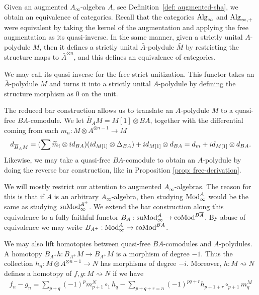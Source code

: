 \documentclass[../thesis.tex]{subfiles}
\begin{document}
            Given an augmented $A_\infty$-algebra $A$, see Definition~\ref{def: augmented-sha}, we obtain an equivalence of categories. Recall that the categories $\tt{Alg}_\infty$ and $\tt{Alg}_{\infty,+}$ were equivalent by taking the kernel of the augmentation and applying the free augmentation as its quasi-inverse. In the same manner, given a strictly unital $A$-polydule $M$, then it defines a strictly unital $\bar{A}$-polydule $\bar{M}$ by restricting the structure maps to $\bar{A}^{\otimes n}$, and this defines an equivalence of categories.
            \begin{center}
            \end{center}
            We may call its quasi-inverse for the free strict unitization. This functor takes an $\overline{A}$-polydule $M$ and turns it into a strictly unital $A$-polydule by defining the structure morphism as $0$ on the unit.

            The reduced bar construction allows us to translate an $A$-polydule $M$ to a quasi-free $BA$-comodule. We let $\overline{B}_AM = M[1] \otimes BA$, together with the differential coming from each $m_n : M \otimes A^{\otimes n - 1} \rightarrow M$
            \begin{align*}
                d_{\overline{B}_AM} = (\sum \widetilde{m}_i \otimes id_{BA})(id_{M[1]}\otimes \Delta_{BA}) + id_{M[1]}\otimes d_{BA} = d_m + id_{M[1]}\otimes d_{BA}\tt{.}
            \end{align*}
            Likewise, we may take a quasi-free $BA$-comodule to obtain an $A$-polydule by doing the reverse bar construction, like in Proposition \ref{prop: free-derivation}.

            We will mostly restrict our attention to augmented $A_\infty$-algebras. The reason for this is that if $A$ is an arbitrary $A_\infty$-algebra, then studying $\tt{Mod}_\infty^A$ would be the same as studying $\tt{suMod}_\infty^{A^+}$. We extend the bar construction along this equivalence to a fully faithful functor $B_A: \tt{suMod}_\infty^A \rightarrow \tt{coMod}^{B\overline{A}}$. By abuse of equivalence we may write $B_{A^+} : \tt{Mod}_\infty^A \rightarrow \tt{coMod}^{BA}$.

            We may also lift homotopies between quasi-free $BA$-comodules and $A$-polydules. A homotopy $B_{A^+}h : B_{A^+}M \rightarrow B_{A^+}M$ is a morphism of degree $-1$. Thus the collection $h_n : M \otimes A^{\otimes n-1} \rightarrow N$ has morphisms of degree $-i$. Moreover, $h : M \rightsquigarrow N$ defines a homotopy of $f, g : M \rightsquigarrow N$ if we have
            \begin{align*}
                f_n - g_n = \sum_{p+q}(-1)^{p}m^N_{p+1}\circ_1 h_q - \sum_{p+q+r = n}(-1)^{pq+r}h_{p+1+r}\circ_{p+1} m^M_q
            \end{align*}
\end{document}
